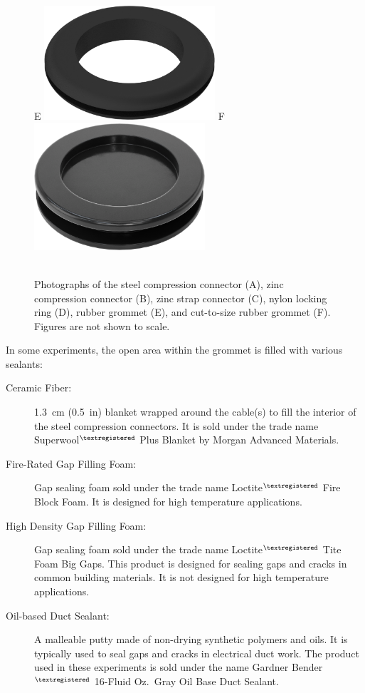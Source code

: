 \begin{figure}[p]
\hfill \\
\hfill \\
E \includegraphics[width=2.5in]{../FIGURES/Rubber_Grommet} \hfill
F \includegraphics[width=2.5in]{../FIGURES/Solid_Rubber_Grommet} \\
\hfill \\
\caption[Photographs of the various grommets]{Photographs of the steel compression connector (A), zinc compression connector (B), zinc strap connector (C), nylon locking ring (D), rubber grommet (E), and cut-to-size rubber grommet (F). Figures are not shown to scale.}
\label{grommet_photo}
\end{figure}


In some experiments, the open area within the grommet is filled with various sealants:
\begin{description}
\item[Ceramic Fiber:] 1.3~cm (0.5~in) blanket wrapped around the cable(s) to fill the interior of the steel compression connectors. It is sold under the trade name Superwool$^{\textregistered}$ Plus Blanket by Morgan Advanced Materials.
\item[Fire-Rated Gap Filling Foam:] Gap sealing foam sold under the trade name Loctite$^{\textregistered}$ Fire Block Foam. It is designed for high temperature applications.
\item[High Density Gap Filling Foam:] Gap sealing foam sold under the trade name Loctite$^{\textregistered}$ Tite Foam Big Gaps. This product is designed for sealing gaps and cracks in common building materials. It is not designed for high temperature applications.
\item[Oil-based Duct Sealant:] A malleable putty made of non-drying synthetic polymers and oils. It is typically used to seal gaps and cracks in electrical duct work. The product used in these experiments is sold under the name Gardner Bender$^{\textregistered}$ 16-Fluid Oz.~Gray Oil Base Duct Sealant.
\end{description}

